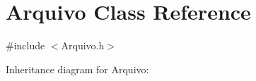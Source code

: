 \hypertarget{class_arquivo}{}\section{Arquivo Class Reference}
\label{class_arquivo}


{\ttfamily \#include $<$Arquivo.\+h$>$}



Inheritance diagram for Arquivo\+:
